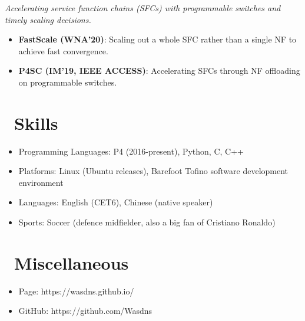 \documentclass{resume}
\begin{document}
\emph{Accelerating service function chains (SFCs) with programmable switches and timely scaling decisions.}
\begin{itemize}
  \item \textbf{FastScale (WNA'20)}: Scaling out a whole SFC rather than a single NF to achieve fast convergence. 
  \item \textbf{P4SC (IM'19, IEEE ACCESS)}: Accelerating SFCs through NF offloading on programmable switches.
\end{itemize}


\section{\faCogs\ Skills}
\begin{itemize}[parsep=0.5ex]
  \iten Academic Services: ICC 2021 Reviewer (NGNI track)
  \item Programming Languages: P4 (2016-present), Python, C, C++
  \item Platforms: Linux (Ubuntu releases), Barefoot Tofino software development environment
  \item Languages: English (CET6), Chinese (native speaker)
  \item Sports: Soccer (defence midfielder, also a big fan of Cristiano Ronaldo)
\end{itemize}


\section{\faInfo\ Miscellaneous}
\begin{itemize}[parsep=0.5ex]
  \item Page: https://wasdns.github.io/
  \item GitHub: https://github.com/Wasdns
\end{itemize}

%
%
\end{document}
